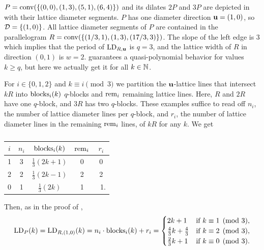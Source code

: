 \begin{example}\label{ex:qp-with-proof}
    $P = \operatorname{conv} (\{ (0,0),(1,3), (5,1), (6,4)\})$ and its dilates $2P$ and $3P$ are depicted in  with their lattice diameter segments. $P$ has one diameter direction $\mathbf{u}=(1,0)$, so \mbox{$\mathcal{D} = \{(1,0)\}$}. All lattice diameter segments of $P$ are contained in the parallelogram $R = \operatorname{conv} (\{ (1/3,1), (1,3), (17/3,3)\})$. The slope of the left edge is $3$ which implies that the period of $\operatorname{LD}_{R,\mathbf{u}}$ is $q=3$, and the lattice width of $R$ in direction $(0,1)$ is $w=2$.  guarantees a quasi-polynomial behavior for values $k \geq q$, but here we actually get it for all $k \in \mathbb{N}$.

    
    
    For $i \in \{0, 1,2\}$ and $k \equiv i \pmod 3$ we partition the $\mathbf{u}$-lattice lines that intersect $kR$ into $\operatorname{blocks}_i(k)$ $q$-blocks and $\operatorname{rem}_i$ remaining lattice lines. Here, $R$ and $2R$ have one $q$-block, and $3R$ has two $q$-blocks. These examples suffice to read off $n_i$, the number of lattice diameter lines per $q$-block, and $r_i$, the number of lattice diameter lines in the remaining $\operatorname{rem}_i$ lines, of $kR$ for any $k$. We get
  \begin{table}[h!]
    \centering
    \begin{tabular}{c|c|c|c|c}
    $i$ & $n_i$ & $\operatorname{blocks}_i(k)$ &$\operatorname{rem}_i$ & $r_i$\\ \hline \rule{0pt}{2.5ex}
    1 \hspace{1pt} & 3 & $\tfrac{1}{3}(2k+1)$ & 0 & 0 \\[3pt]
    2 & 2 & $\tfrac{1}{3}(2k-1)$ & 2 & 2 \\[3pt]
    0 & 1 & $\tfrac{1}{3}(2k)$ & 1 & \ 1.
    \end{tabular}\vspace{-1em}
    \caption*{}
\end{table}

\vspace{-1em}
Then, as in the proof of ,
\begin{align*}
    \operatorname{LD}_P(k) = \operatorname{LD}_{R, (1,0)}(k) = n_i \cdot \operatorname{blocks}_i(k)+ r_i = \begin{cases}
         2k+1 & \text{if } k \equiv 1 \pmod 3,\\
            \frac{4}{3} k + \frac{4}{3} & \text{if } k \equiv 2 \pmod 3,\\
            \frac{2}{3} k + 1 & \text{if } k \equiv 0 \pmod 3.
    \end{cases}
\end{align*}
    
\end{example}

